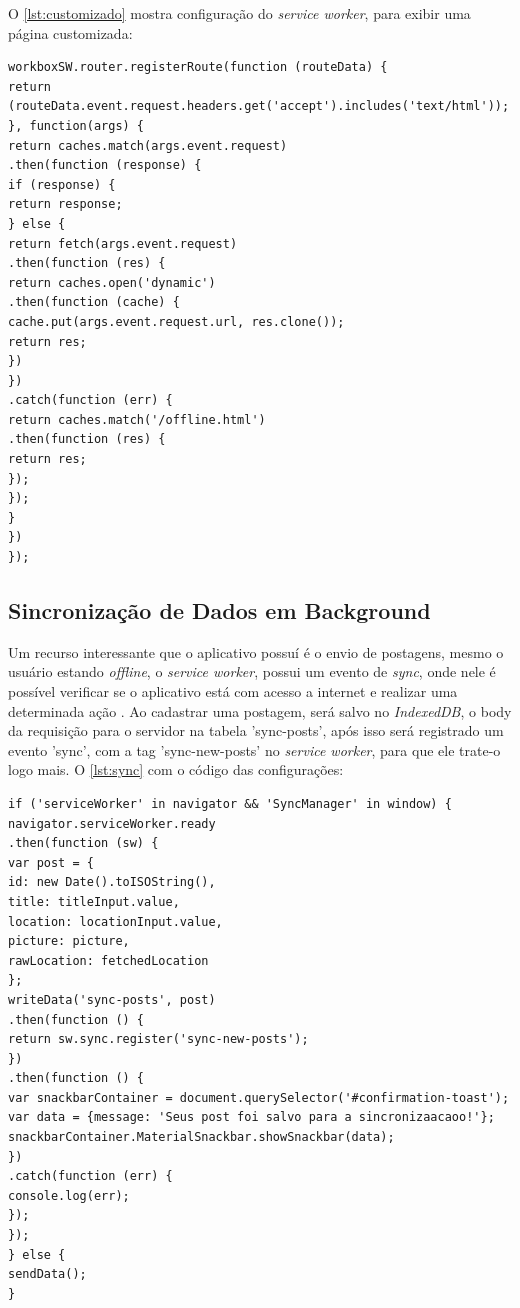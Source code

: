 O \autoref{lst:customizado} mostra configuração do \textit{service worker}, para exibir uma página customizada:

\newpage

\begin{lstlisting}[frame=single,label=lst:customizado,caption=Página offline customizada, basicstyle=\footnotesize]
workboxSW.router.registerRoute(function (routeData) {
return (routeData.event.request.headers.get('accept').includes('text/html'));
}, function(args) {
return caches.match(args.event.request)
.then(function (response) {
if (response) {
return response;
} else {
return fetch(args.event.request)
.then(function (res) {
return caches.open('dynamic')
.then(function (cache) {
cache.put(args.event.request.url, res.clone());
return res;
})
})
.catch(function (err) {
return caches.match('/offline.html')
.then(function (res) {
return res;
});
});
}
})
});
\end{lstlisting}

\vspace{-0.75cm}
\begin{center}
\end{center}

\subsection{Sincronização de Dados em Background}
Um recurso interessante que o aplicativo possuí é o envio de postagens, mesmo o usuário estando \textit{offline}, o \textit{service worker}, possui um evento de \textit{sync}, onde nele é possível verificar se o aplicativo está com acesso a internet e realizar uma determinada ação \cite{servicework}. 
\newline{}
Ao cadastrar uma postagem, será salvo no \textit{IndexedDB}, o body da requisição para o servidor na tabela 'sync-posts', após isso será registrado um evento 'sync', com a tag 'sync-new-posts' no \textit{service worker}, para que ele trate-o logo mais. O \autoref{lst:sync} com o código das configurações:
\begin{lstlisting}[frame=single,label=lst:sync,caption=Sicronização Em Background, basicstyle=\footnotesize]
if ('serviceWorker' in navigator && 'SyncManager' in window) {
navigator.serviceWorker.ready
.then(function (sw) {
var post = {
id: new Date().toISOString(),
title: titleInput.value,
location: locationInput.value,
picture: picture,
rawLocation: fetchedLocation
};
writeData('sync-posts', post)
.then(function () {
return sw.sync.register('sync-new-posts');
})
.then(function () {
var snackbarContainer = document.querySelector('#confirmation-toast');
var data = {message: 'Seus post foi salvo para a sincronizaacaoo!'};
snackbarContainer.MaterialSnackbar.showSnackbar(data);
})
.catch(function (err) {
console.log(err);
});
});
} else {
sendData();
}
\end{lstlisting}
\vspace{-0.75cm}
\begin{center}
\end{center}


